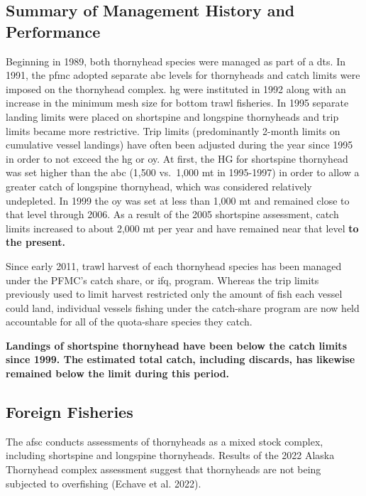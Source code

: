 \documentclass[11pt,
  english,
  letterpaper,
]{article}
\begin{document}
\hypertarget{summary-of-management-history-and-performance}{%
\subsection{Summary of Management History and Performance}\label{summary-of-management-history-and-performance}}

Beginning in 1989, both thornyhead species were managed as part of a \gls{dts}. In 1991, the \gls{pfmc} adopted separate \gls{abc} levels for thornyheads and catch limits were imposed on the thornyhead complex. \gls{hg} were instituted in 1992 along with an increase in the minimum mesh size for bottom trawl fisheries. In 1995 separate landing limits were placed on shortspine and longspine thornyheads and trip limits became more restrictive. Trip limits (predominantly 2-month limits on cumulative vessel landings) have often been adjusted during the year since 1995 in order to not exceed the \gls{hg} or \gls{oy}. At first, the HG for shortspine thornyhead was set higher than the \gls{abc} (1,500 vs.~1,000 mt in 1995-1997) in order to allow a greater catch of longspine thornyhead, which was considered relatively undepleted. In 1999 the \gls{oy} was set at less than 1,000 mt and remained close to that level through 2006. As a result of the 2005 shortspine assessment, catch limits increased to about 2,000 mt per year and have remained near that level \textbf{to the present.}

Since early 2011, trawl harvest of each thornyhead species has been managed under the PFMC's catch share, or \gls{ifq}, program. Whereas the trip limits previously used to limit harvest restricted only the amount of fish each vessel could land, individual vessels fishing under the catch-share program are now held accountable for all of the quota-share species they catch.

\textbf{Landings of shortspine thornyhead have been below the catch limits since 1999. The estimated total catch, including discards, has likewise remained below the limit during this period.}

\hypertarget{foreign-fisheries}{%
\subsection{Foreign Fisheries}\label{foreign-fisheries}}

The \gls{afsc} conducts assessments of thornyheads as a mixed stock complex, including shortspine and longspine thornyheads. Results of the 2022 Alaska Thornyhead complex assessment suggest that thornyheads are not being subjected to overfishing (Echave et al. 2022).
\end{document}

